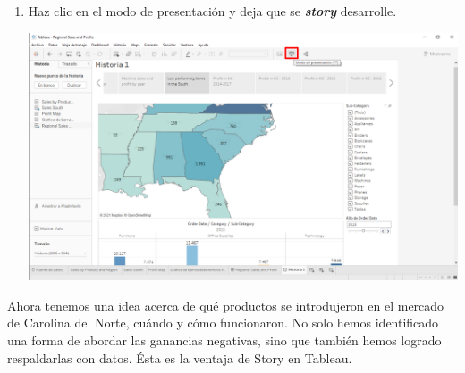 \documentclass[12pt,letterpaper]{article}
\begin{document}
\begin{enumerate}
\begin{center}
        \end{center}
        \item Haz clic en el modo de presentación y deja que se \textit{\textbf{story}} desarrolle.
        \begin{center}
            \includegraphics[width=15cm]{./img/img101.png}
        \end{center}
    \end{enumerate}
    Ahora tenemos una idea acerca de qué productos se introdujeron en el mercado de Carolina del Norte, cuándo y cómo funcionaron. No solo hemos identificado una forma de abordar las ganancias negativas, sino que también hemos logrado respaldarlas con datos. Ésta es la ventaja de Story en Tableau.
    \newpage
\end{document}
